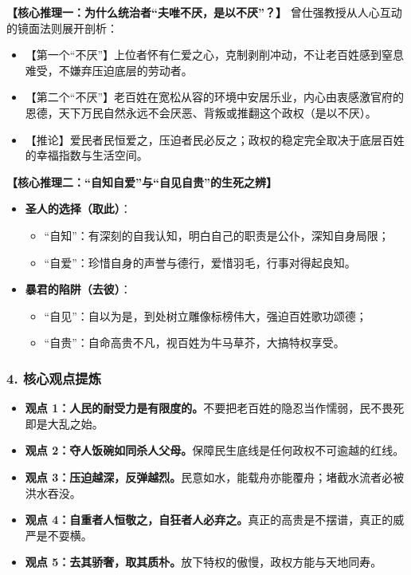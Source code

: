 \noindent\textbf{【核心推理一：为什么统治者“夫唯不厌，是以不厌”？】}
曾仕强教授从人心互动的镜面法则展开剖析：
\begin{itemize}
    \item 【第一个“不厌”】上位者怀有仁爱之心，克制剥削冲动，不让老百姓感到窒息难受，不嫌弃压迫底层的劳动者。
    \item 【第二个“不厌”】老百姓在宽松从容的环境中安居乐业，内心由衷感激官府的恩德，天下万民自然永远不会厌恶、背叛或推翻这个政权（是以不厌）。
    \item 【推论】爱民者民恒爱之，压迫者民必反之；政权的稳定完全取决于底层百姓的幸福指数与生活空间。
\end{itemize}

\noindent\textbf{【核心推理二：“自知自爱”与“自见自贵”的生死之辨】}
\begin{itemize}
    \item \textbf{圣人的选择（取此）}：
    \begin{itemize}
        \item “自知”：有深刻的自我认知，明白自己的职责是公仆，深知自身局限；
        \item “自爱”：珍惜自身的声誉与德行，爱惜羽毛，行事对得起良知。
    \end{itemize}
    \item \textbf{暴君的陷阱（去彼）}：
    \begin{itemize}
        \item “自见”：自以为是，到处树立雕像标榜伟大，强迫百姓歌功颂德；
        \item “自贵”：自命高贵不凡，视百姓为牛马草芥，大搞特权享受。
    \end{itemize}
\end{itemize}

\subsubsection{4. 核心观点提炼}
\begin{itemize}
    \item \textbf{观点 1：人民的耐受力是有限度的。}不要把老百姓的隐忍当作懦弱，民不畏死即是大乱之始。
    \item \textbf{观点 2：夺人饭碗如同杀人父母。}保障民生底线是任何政权不可逾越的红线。
    \item \textbf{观点 3：压迫越深，反弹越烈。}民意如水，能载舟亦能覆舟；堵截水流者必被洪水吞没。
    \item \textbf{观点 4：自重者人恒敬之，自狂者人必弃之。}真正的高贵是不摆谱，真正的威严是不耍横。
    \item \textbf{观点 5：去其骄奢，取其质朴。}放下特权的傲慢，政权方能与天地同寿。
\end{itemize}


